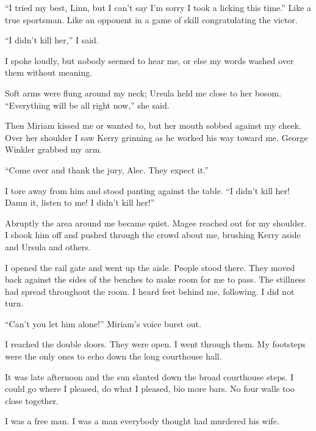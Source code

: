 \documentclass{novel}
\begin{document}
“I tried my best, Linn, but I can’t say I’m sorry I took a licking this time.” Like a true sportsman. Like an opponent in a game of skill congratulating the victor.

“I didn’t kill her,” I said.

I spoke loudly, but nobody seemed to hear me, or else my words washed over them without meaning.

Soft arms were flung around my neck; Ursula held me close to her bosom. “Everything will be all right now,” she said. 

Then Miriam kissed me or wanted to, but her mouth sobbed against my cheek. Over her shoulder I saw Kerry grinning as he worked his way toward me. George Winkler grabbed my arm. 

“Come over and thank the jury, Alec. They expect it.”

I tore away from him and stood panting against the table. “I didn’t kill her! Damn it, listen to me! I didn’t kill her!”

Abruptly the area around me became quiet. Magee reached out for my shoulder. I shook him off and pushed through the crowd about me, brushing Kerry aside and Ursula and others. 

I opened the rail gate and went up the aisle. People stood there. They moved back against the sides of the benches to make room for me to pass. The stillness had spread throughout the room. I heard feet behind me, following. I did not turn.

“Can’t you let him alone!” Miriam’s voice burst out.

I reached the double doors. They were open. I went through them. My footsteps were the only ones to echo down the long courthouse hall.

It was late afternoon and the sun slanted down the broad courthouse steps. I could go where I pleased, do what I pleased, bio more bars. No four walls too close together.

I was a free man. I was a man everybody thought had murdered his wife.

\vspace{2\nbs}
\clearpage
\thispagestyle{empty}
\begin{ChapterStart}
\vspace{3\nbs}
\end{ChapterStart}
\end{document}
